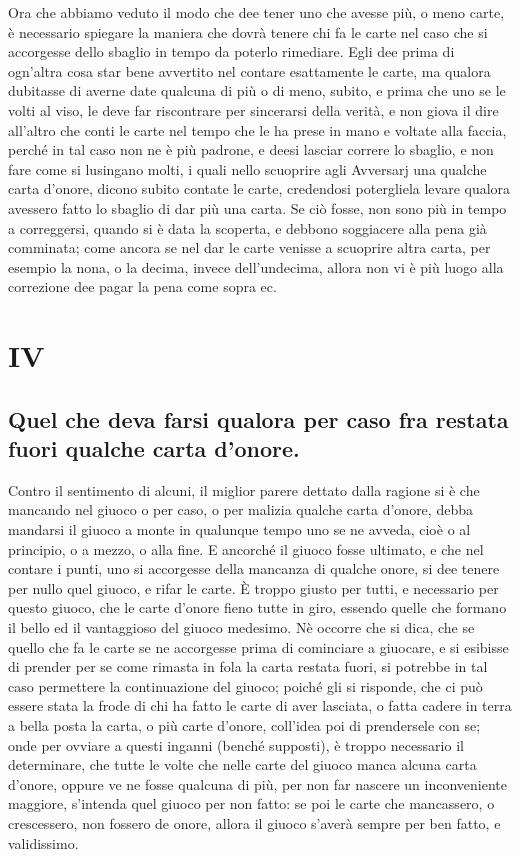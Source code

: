 \documentclass[11pt,a6paper]{article}
\begin{document}
Ora che abbiamo veduto il modo che
dee tener uno che avesse più, o meno carte, è necessario spiegare la maniera che dovrà tenere chi fa le carte nel caso che si accorgesse dello sbaglio in tempo da poterlo rimediare. Egli dee prima di ogn'altra cosa star bene avvertito nel contare esattamente le carte, ma qualora dubitasse di averne date qualcuna di più o di meno, subito, e prima che uno se le volti al viso, le deve far riscontrare per sincerarsi della verità, e non giova il dire all'altro che conti le carte nel tempo che le ha prese in mano e voltate alla faccia, perché in tal caso non ne è più padrone, e deesi lasciar correre lo sbaglio, e non fare come si lusingano molti, i quali nello scuoprire agli Avversarj una qualche carta d'onore, dicono
subito contate le carte, credendosi potergliela levare qualora avessero fatto lo sbaglio di dar più una carta. Se ciò fosse, non sono più in tempo a correggersi, quando si è data la scoperta, e debbono soggiacere alla pena già comminata; come ancora se nel dar le carte venisse a scuoprire altra carta, per esempio la nona, o la decima, invece dell'undecima, allora non vi è più luogo alla correzione dee pagar la pena come sopra ec.

\section{IV}
\subsection*{Quel che deva farsi qualora per caso fra
restata fuori qualche carta d'onore.}

Contro il sentimento di alcuni, il miglior parere dettato dalla ragione si è che mancando nel giuoco o per caso, o per malizia qualche carta d'onore, debba mandarsi il giuoco a monte in qualunque tempo uno se ne avveda, cioè o al principio, o a mezzo, o alla fine. E ancorché il giuoco fosse ultimato, e che nel contare i punti, uno si accorgesse
della mancanza di qualche onore, si dee tenere per nullo quel giuoco, e rifar le carte. È troppo giusto per tutti, e necessario per questo giuoco, che le carte d'onore fieno tutte in giro, essendo quelle che formano il bello ed il vantaggioso del giuoco medesimo. Nè occorre che si dica, che se quello che fa le carte se ne accorgesse prima di cominciare a giuocare, e si esibisse di prender per se come rimasta in fola la carta restata fuori, si potrebbe in tal caso permettere la continuazione del giuoco; poiché gli si risponde, che ci può essere stata la frode di chi ha fatto le carte di aver lasciata, o fatta cadere in terra a bella posta la carta, o più carte d'onore, coll'idea poi di prendersele con se; onde per ovviare a questi inganni (benché supposti), è troppo necessario il determinare, che tutte le volte che nelle carte del giuoco manca alcuna carta d'onore, oppure ve ne fosse qualcuna di più, per non far nascere un inconveniente maggiore, s'intenda quel giuoco per non fatto: se poi le carte che mancassero, o crescessero, non fossero de
onore, allora il giuoco s'averà sempre per ben fatto, e validissimo.
\end{document}
